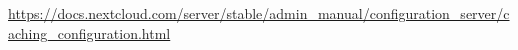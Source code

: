 \url{https://docs.nextcloud.com/server/stable/admin_manual/configuration_server/caching_configuration.html}
